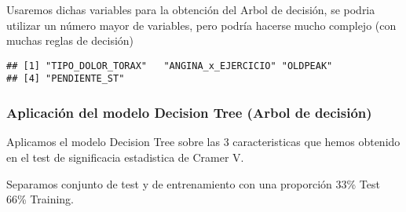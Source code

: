 \documentclass[
]{article}
\newenvironment{Shaded}{\begin{snugshade}}{\end{snugshade}}
\newcommand{\CommentTok}[1]{\textcolor[rgb]{0.50,0.62,0.50}{#1}}
\newcommand{\ConstantTok}[1]{\textcolor[rgb]{0.86,0.64,0.64}{\textbf{#1}}}
\newcommand{\ControlFlowTok}[1]{\textcolor[rgb]{0.94,0.87,0.69}{#1}}
\newcommand{\FloatTok}[1]{\textcolor[rgb]{0.75,0.75,0.82}{#1}}
\newcommand{\FunctionTok}[1]{\textcolor[rgb]{0.94,0.94,0.56}{#1}}
\newcommand{\NormalTok}[1]{\textcolor[rgb]{0.80,0.80,0.80}{#1}}
\newcommand{\OtherTok}[1]{\textcolor[rgb]{0.94,0.94,0.56}{#1}}
\newcommand{\SpecialCharTok}[1]{\textcolor[rgb]{0.86,0.64,0.64}{#1}}
\newcommand{\StringTok}[1]{\textcolor[rgb]{0.80,0.58,0.58}{#1}}
\begin{document}
Usaremos dichas variables para la obtención del Arbol de decisión, se
podria utilizar un número mayor de variables, pero podría hacerse mucho
complejo (con muchas reglas de decisión)

\begin{Shaded}
\end{Shaded}

\begin{verbatim}
## [1] "TIPO_DOLOR_TORAX"   "ANGINA_x_EJERCICIO" "OLDPEAK"           
## [4] "PENDIENTE_ST"
\end{verbatim}

\hypertarget{aplicaciuxf3n-del-modelo-decision-tree-arbol-de-decisiuxf3n}{%
\subsubsection{Aplicación del modelo Decision Tree (Arbol de
decisión)}\label{aplicaciuxf3n-del-modelo-decision-tree-arbol-de-decisiuxf3n}}

Aplicamos el modelo Decision Tree sobre las 3 caracteristicas que hemos
obtenido en el test de significacia estadistica de Cramer V.

\begin{Shaded}
\end{Shaded}

Separamos conjunto de test y de entrenamiento con una proporción 33\%
Test 66\% Training.
\end{document}
